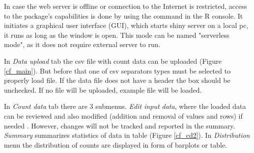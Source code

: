 In case the web server is offline or connection to the Internet is restricted, access to the package’s capabilities is done by using the command in the R console. It initiates a graphical user interface (GUI), which starts shiny server on a local pc, it runs as long as the window is open. This mode can be named "serverless mode", as it does not require external server to run.


In \textit{Data upload} tab the csv file with count data can be uploaded (Figure \ref{cf_main}). But before that one of csv separators types must be selected to properly load file. If the data file does not have a header the box should be unchecked. If no file will be uploaded, example file will be loaded.


In \textit{Count data} tab there are 3 submenus. \textit{Edit input data}, where the loaded data can be reviewed and also modified (addition and removal of values and rows) if needed
. However, changes will not be tracked and reported in the summary. \textit{Summary} summarizes statistics of data in table (Figure \ref{cf_cd2}). In \textit{Distribution} menu the distribution of counts are displayed in form of barplots or table.


